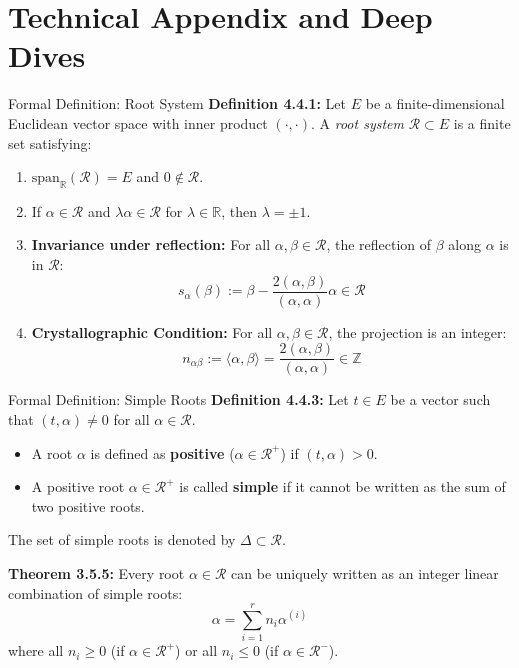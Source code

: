\section{Technical Appendix and Deep Dives}

\begin{frame}[label=backup_rootsystem]{Formal Definition: Root System}
    \textbf{Definition 4.4.1:} Let $E$ be a finite-dimensional Euclidean vector space with inner product $(\cdot, \cdot)$. A \textit{root system} $\mathcal{R} \subset E$ is a finite set satisfying:
    \begin{enumerate}
        \item $\text{span}_{\mathbb{R}}(\mathcal{R}) = E$ and $0 \notin \mathcal{R}$.
        \item If $\alpha \in \mathcal{R}$ and $\lambda \alpha \in \mathcal{R}$ for $\lambda \in \mathbb{R}$, then $\lambda = \pm 1$.
        \item \textbf{Invariance under reflection:} For all $\alpha, \beta \in \mathcal{R}$, the reflection of $\beta$ along $\alpha$ is in $\mathcal{R}$:
              $$s_\alpha(\beta) := \beta - \frac{2(\alpha, \beta)}{(\alpha, \alpha)} \alpha \in \mathcal{R}$$
        \item \textbf{Crystallographic Condition:} For all $\alpha, \beta \in \mathcal{R}$, the projection is an integer:
              $$n_{\alpha\beta} := \langle \alpha, \beta \rangle = \frac{2(\alpha, \beta)}{(\alpha, \alpha)} \in \mathbb{Z}$$
    \end{enumerate}
\end{frame}

\begin{frame}[label=backup_simpleroots]{Formal Definition: Simple Roots}
    \textbf{Definition 4.4.3:}
    Let $t \in E$ be a vector such that $(t, \alpha) \neq 0$ for all $\alpha \in \mathcal{R}$.

    \begin{itemize}
        \item A root $\alpha$ is defined as \textbf{positive} ($\alpha \in \mathcal{R}^+$) if $(t, \alpha) > 0$.
        \item A positive root $\alpha \in \mathcal{R}^+$ is called \textbf{simple} if it cannot be written as the sum of two positive roots.
    \end{itemize}

    The set of simple roots is denoted by $\Delta \subset \mathcal{R}$.

    \vspace{0.3cm}
    \textbf{Theorem 3.5.5:} Every root $\alpha \in \mathcal{R}$ can be uniquely written as an integer linear combination of simple roots:
    $$ \alpha = \sum_{i=1}^r n_i \alpha^{(i)} $$
    where all $n_i \ge 0$ (if $\alpha \in \mathcal{R}^+$) or all $n_i \le 0$ (if $\alpha \in \mathcal{R}^-$).
\end{frame}

